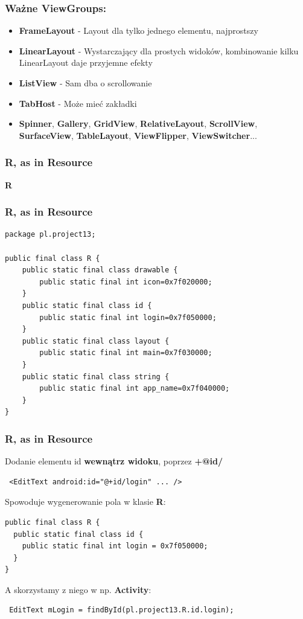 \begin{frame}\frametitle{Ważne ViewGroups:}
\begin{itemize}
 \item \textbf{FrameLayout} - Layout dla tylko jednego elementu, najprostszy
 \item \textbf{LinearLayout} - Wystarczający dla prostych widoków, kombinowanie kilku LinearLayout daje przyjemne efekty
 \item \textbf{ListView} - Sam dba o scrollowanie
 \item \textbf{TabHost} - Może mieć zakładki
 \pause \item \textbf{Spinner}, \textbf{Gallery}, \textbf{GridView}, \textbf{RelativeLayout}, \textbf{ScrollView}, \textbf{SurfaceView}, \textbf{TableLayout}, \textbf{ViewFlipper}, \textbf{ViewSwitcher}...
\end{itemize}
\end{frame}


\begin{frame}\frametitle{R, as in Resource}  
\begin{center}
 \Huge{\textbf{R}}
\end{center}
\end{frame}

\begin{frame}[fragile]\frametitle{R, as in Resource}
 \begin{lstlisting}
package pl.project13;

public final class R {
    public static final class drawable {
        public static final int icon=0x7f020000;
    }
    public static final class id {
        public static final int login=0x7f050000;
    }
    public static final class layout {
        public static final int main=0x7f030000;
    }
    public static final class string {
        public static final int app_name=0x7f040000;
    }
}
 \end{lstlisting}
\end{frame}

\begin{frame}[fragile] \frametitle{R, as in Resource}  
 Dodanie elementu id \textbf{wewnątrz widoku}, poprzez \textbf{+@id/}
\begin{lstlisting}
 <EditText android:id="@+id/login" ... />
\end{lstlisting}

\pause

Spowoduje wygenerowanie pola w klasie \textbf{R}:
\begin{lstlisting}
public final class R {
  public static final class id {
    public static final int login = 0x7f050000;
  }
}
\end{lstlisting}

\pause

A skorzystamy z niego w np. \textbf{Activity}:
\begin{lstlisting}
 EditText mLogin = findById(pl.project13.R.id.login);
\end{lstlisting}
\end{frame}

